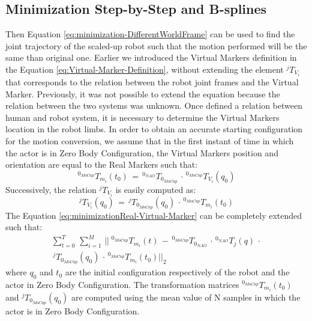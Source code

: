 \documentclass[a4paper, 10pt, conference]{ieeeconf}
\begin{document}
\subsection{Minimization Step-by-Step and B-splines}
Then Equation \eqref{eq:minimization-DifferentWorldFrame} can be used to find the joint trajectory of the scaled-up robot such that the motion performed will be the same than original one.
Earlier we introduced the Virtual Markers definition in the Equation \eqref{eq:Virtual-Marker-Definition}, without extending the element $^{j}T_{V_i}$ that corresponds to the relation between the robot joint frames and the Virtual Marker.
Previously, it was not possible to extend the equation because the relation between the two systems was unknown.
Once defined a relation between human and robot system, it is necessary to determine the Virtual Markers location in the robot limbs. In order to obtain an accurate starting configuration for the motion conversion, we assume that in the first instant of time in which the actor is in Zero Body Configuration, the Virtual Markers position and orientation are equal to the Real Markers such that:
\begin{equation}
^{0_{MoCap}}T_{m_i}(t_0) \, = \, ^{0_{NAO}}T_{0_{MoCap}} \, \cdot \,  ^{0_{MoCap}}T_{V_i}(q_0)
\end{equation}
Successively, the relation $^{j}T_{V_i}$ is easily computed as:
\begin{equation}
^jT_{V_i}(q_0) \, = \, ^jT_{0_{MoCap}}(q_0) \, \cdot \, ^{0_{MoCap}}T_{m_i}(t_0)
\end{equation}
The Equation \eqref{eq:minimizationReal-Virtual-Marker} can be completely extended such that:
\begin{equation}
\begin{split}
\sum^{T}_{t=0} \, \sum^{M}_{i=1} \, || \; ^{0_{MoCap}}T_{m_i}(t) \, - \, ^{0_{MoCap}}T_{0_{NAO}}\, \cdot \, ^{0_{NAO}}T_{j}(q) \, \cdot \\ \, ^jT_{0_{MoCap}}(q_0) \, \cdot \, ^{0_{MoCap}}T_{m_i}(t_0) ||_2
\end{split}
\label{eq:extension-minimizationReal-Virtual-Marker}
\end{equation}
where $q_0$ and $t_0$ are the initial configuration respectively of the robot and the actor in Zero Body Configuration. The transformation matrices $^{0_{MoCap}}T_{m_i}(t_0)$ and $^jT_{0_{MoCap}}(q_0)$ are computed using the mean value of N samples in which the actor is in Zero Body Configuration.
\end{document}
